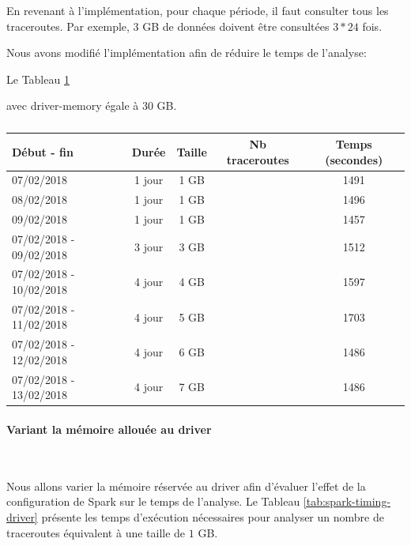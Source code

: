 En revenant à l'implémentation, pour chaque période, il faut consulter tous les traceroutes. Par exemple, 3 GB de données doivent être consultées $ 3 * 24 $ fois.


Nous avons modifié l'implémentation afin de réduire le temps de l'analyse:

Le Tableau 	\ref{tab:spark-timing-reajustedcode}

avec driver-memory égale à 30 GB.

\begin{table}[H]
	\begin{tabular}{lcccc}
		\textbf{Début - fin} &\textbf{Durée}  & \textbf{Taille}  & \textbf{Nb traceroutes} & \textbf{Temps (secondes)} \\ \hline
		
		07/02/2018&1 jour&1 GB&& 1491\\ \hline
		08/02/2018&1 jour&1 GB&& 1496 \\ \hline
		09/02/2018&1 jour& 1 GB&& 1457 \\ \hline
		07/02/2018 - 09/02/2018&3 jour& 3 GB&& 1512 \\ \hline
		07/02/2018 - 10/02/2018&4 jour& 4 GB& & 1597  \\ \hline
	    07/02/2018 - 11/02/2018&4 jour& 5 GB& & 1703  \\ \hline
			    07/02/2018 - 12/02/2018&4 jour& 6 GB& & 1486  \\ \hline
		
					    07/02/2018 - 13/02/2018&4 jour& 7 GB& & 1486  \\ \hline
		
	\end{tabular}
	\caption{}
	\label{tab:spark-timing-reajustedcode}
\end{table}


\paragraph{Variant la mémoire allouée au driver}~

Nous allons varier la mémoire réservée au driver afin d'évaluer l'effet de la configuration de Spark sur le temps de l'analyse. Le Tableau 	\ref{tab:spark-timing-driver} présente les temps d'exécution nécessaires pour analyser un nombre de traceroutes équivalent à une taille de $ 1 $ GB. 


